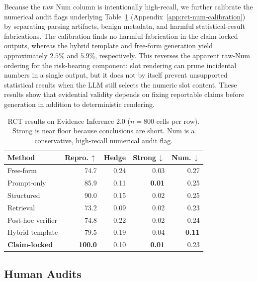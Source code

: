 \documentclass[10pt,twocolumn]{article}
\begin{document}
Because the raw Num column is intentionally high-recall, we further calibrate the numerical audit flags underlying Table~\ref{tab:rct} (Appendix~\ref{app:rct-num-calibration}) by separating parsing artifacts, benign metadata, and harmful statistical-result fabrications. The calibration finds no harmful fabrication in the claim-locked outputs, whereas the hybrid template and free-form generation yield approximately $2.5\%$ and $5.9\%$, respectively. This reverses the apparent raw-Num ordering for the risk-bearing component: slot rendering can prune incidental numbers in a single output, but it does not by itself prevent unsupported statistical results when the LLM still selects the numeric slot content. These results show that evidential validity depends on fixing reportable claims before generation in addition to deterministic rendering.
\begin{table}[t]
	\caption{RCT results on Evidence Inference 2.0 ($n=800$ cells per row). Strong is near floor because conclusions are short. Num is a conservative, high-recall numerical audit flag.}
	\label{tab:rct}
	\centering
	\footnotesize
	\setlength{\tabcolsep}{4pt}
	\begin{tabular}{lrrrr}
		\toprule
		Method & Repro.\,$\uparrow$ & Hedge & Strong\,$\downarrow$ & Num.\,$\downarrow$ \\
		\midrule
		Free-form          & 74.7 & 0.24 & 0.03 & 0.27 \\
		Prompt-only        & 85.9 & 0.11 & \textbf{0.01} & 0.25 \\
		Structured         & 90.0 & 0.15 & 0.02 & 0.25 \\
		Retrieval          & 73.2 & 0.09 & 0.02 & 0.23 \\
		Post-hoc verifier  & 74.8 & 0.22 & 0.02 & 0.24 \\
		Hybrid template    & 79.5 & 0.19 & 0.04 & \textbf{0.11} \\
		\textbf{Claim-locked} & \textbf{100.0} & 0.10 & \textbf{0.01} & 0.23 \\
		\bottomrule
	\end{tabular}
\end{table}
\subsection{Human Audits}
\label{sec:human}
\end{document}
